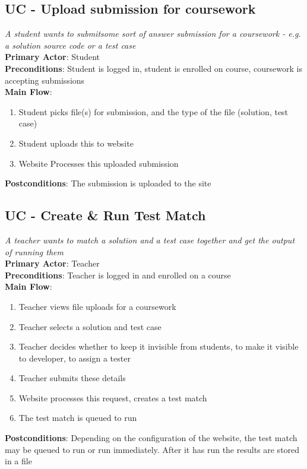 \documentclass[a4paper,11pt]{report}
\begin{document}
\subsection*{UC - Upload submission for coursework}
\textit{A student wants to submitsome sort of answer submission for a coursework - e.g. a solution source code or a test case}\\
\textbf{Primary Actor}: Student\\
\textbf{Preconditions}: Student is logged in, student is enrolled on course, coursework is accepting submissions\\
\textbf{Main Flow}:
\begin{enumerate}
\item Student picks file(s) for submission, and the type of the file (solution, test case)
\item Student uploads this to website
\item Website Processes this uploaded submission
\end{enumerate}
\textbf{Postconditions}: The submission is uploaded to the site

\subsection*{UC - Create \& Run Test Match}
\textit{A teacher wants to match a solution and a test case together and get the output of running them}\\
\textbf{Primary Actor}: Teacher\\
\textbf{Preconditions}: Teacher is logged in and enrolled on a course\\
\textbf{Main Flow}:
\begin{enumerate}
\item Teacher views file uploads for a coursework
\item Teacher selects a solution and test case
\item Teacher decides whether to keep it invisible from students, to make it visible to developer, to assign a tester
\item Teacher submits these details
\item Website processes this request, creates a test match
\item The test match is queued to run
\end{enumerate}
\textbf{Postconditions}: Depending on the configuration of the website, the test match may be queued to run or run immediately. After it has run the results are stored in a file
\end{document}
